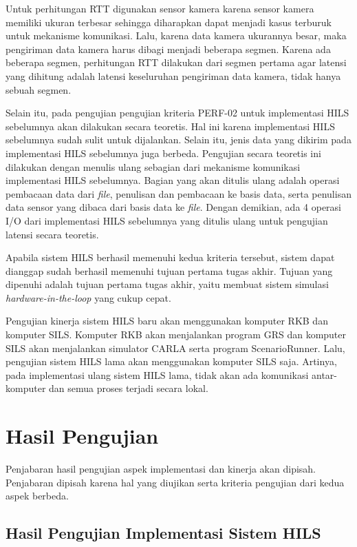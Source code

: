 Untuk perhitungan RTT digunakan sensor kamera karena sensor kamera memiliki
ukuran terbesar sehingga diharapkan dapat menjadi kasus terburuk untuk mekanisme
komunikasi. Lalu, karena data kamera ukurannya besar, maka pengiriman data
kamera harus dibagi menjadi beberapa segmen. Karena ada beberapa segmen,
perhitungan RTT dilakukan dari segmen pertama agar latensi yang dihitung adalah
latensi keseluruhan pengiriman data kamera, tidak hanya sebuah segmen.

Selain itu, pada pengujian pengujian kriteria PERF-02 untuk implementasi HILS
sebelumnya akan dilakukan secara teoretis. Hal ini karena implementasi HILS
sebelumnya sudah sulit untuk dijalankan. Selain itu, jenis data yang dikirim
pada implementasi HILS sebelumnya juga berbeda. Pengujian secara teoretis ini
dilakukan dengan menulis ulang sebagian dari mekanisme komunikasi implementasi
HILS sebelumnya. Bagian yang akan ditulis ulang adalah operasi pembacaan data
dari \textit{file}, penulisan dan pembacaan ke basis data, serta penulisan data
sensor yang dibaca dari basis data ke \textit{file}. Dengan demikian, ada 4
operasi I/O dari implementasi HILS sebelumnya yang ditulis ulang untuk pengujian
latensi secara teoretis.

Apabila sistem HILS berhasil memenuhi kedua kriteria tersebut, sistem dapat
dianggap sudah berhasil memenuhi tujuan pertama tugas akhir. Tujuan yang
dipenuhi adalah tujuan pertama tugas akhir, yaitu membuat sistem simulasi
\textit{hardware-in-the-loop} yang cukup cepat.

Pengujian kinerja sistem HILS baru akan menggunakan komputer RKB dan komputer
SILS. Komputer RKB akan menjalankan program GRS dan komputer SILS akan
menjalankan simulator CARLA serta program ScenarioRunner. Lalu, pengujian sistem
HILS lama akan menggunakan komputer SILS saja. Artinya, pada implementasi ulang
sistem HILS lama, tidak akan ada komunikasi antar-komputer dan semua proses
terjadi secara lokal.

\section{Hasil Pengujian}

Penjabaran hasil pengujian aspek implementasi dan kinerja akan dipisah.
Penjabaran dipisah karena hal yang diujikan serta kriteria pengujian dari kedua
aspek berbeda.

\subsection{Hasil Pengujian Implementasi Sistem HILS}

